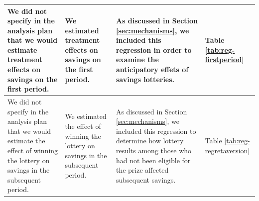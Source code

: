 \documentclass[12pt]{article}
\begin{document}
\begin{landscape}
\begin{longtable}{p{}p{}p{}p{}}
			\midrule
			We did not specify in the analysis plan that we would estimate treatment effects on savings on the first period. & We estimated treatment effects on savings on the first period. & As discussed in Section \ref{sec:mechanisms}, we included this regression in order to examine the anticipatory effets of savings lotteries. & Table \ref{tab:reg-firstperiod} \\
			\midrule
			We did not specify in the analysis plan that we would estimate the effect of winning the lottery on savings in the subsequent period. & We estimated the effect of winning the lottery on savings in the subsequent period. & As discussed in Section \ref{sec:mechanisms}, we included this regression to determine how lottery results among those who had not been eligible for the prize affected subsequent savings. & Table \ref{tab:reg-regretaversion} \\
		\end{longtable}

	\end{landscape}

	
	
	
	
	

	\clearpage
\end{document}
